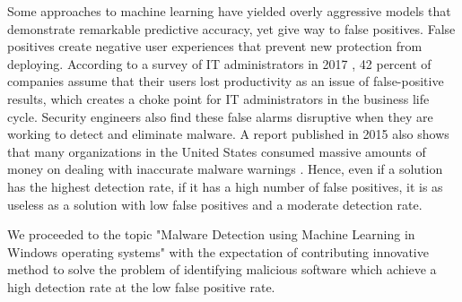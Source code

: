 Some approaches to machine learning have yielded overly aggressive models that demonstrate remarkable predictive accuracy, yet give way to false positives. 
False positives create negative user experiences that prevent new protection from deploying. According to a survey of IT administrators in 2017 \cite{jonathan2017survey}, 42 percent of companies assume that their users lost productivity as an issue of false-positive results, which creates a choke point for IT administrators in the business life cycle. 
Security engineers also find these false alarms disruptive when they are working to detect and eliminate malware. A report published in 2015 also shows that many organizations in the United States consumed massive amounts of money on dealing with inaccurate malware warnings \cite{eduard2015false}. 
Hence, even if a solution has the highest detection rate, if it has a high number of false positives, it is as useless as a solution with low false positives and a moderate detection rate.

We proceeded to the topic "Malware Detection using Machine Learning in Windows operating systems" with the expectation of contributing innovative method to solve the problem of identifying malicious software which achieve a high detection rate at the low false positive rate.
